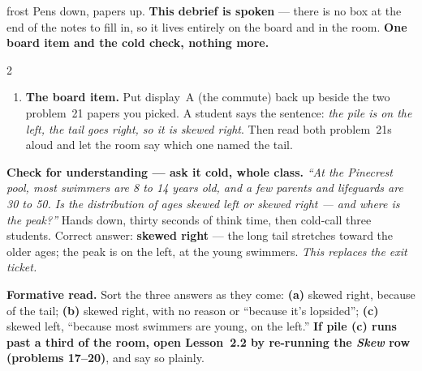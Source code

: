 \documentclass[10pt]{article}
\begin{document}
\boxguard[24]
\begin{skillbox}{frost}
Pens down, papers up. \textbf{This debrief is spoken} --- there is no box at the end of the
notes to fill in, so it lives entirely on the board and in the room. \textbf{One board item and
the cold check, nothing more.}
\begin{multicols}{2}
\begin{enumerate}[leftmargin=1.3em, nosep, itemsep=3pt]
  \item \textbf{The board item.} Put display~A (the commute) back up beside the two problem~21
        papers you picked. A student says the sentence: \emph{the pile is on the left, the tail
        goes right, so it is skewed right}. Then read both problem~21s aloud and let the room
        say which one named the tail.
\end{enumerate}
\columnbreak
\textbf{Check for understanding --- ask it cold, whole class.} \emph{``At the Pinecrest pool, most
swimmers are 8 to 14 years old, and a few parents and lifeguards are 30 to 50. Is the
distribution of ages skewed left or skewed right --- and where is the peak?''} Hands down, thirty
seconds of think time, then cold-call three students. Correct answer: \textbf{skewed right} ---
the long tail stretches toward the older ages; the peak is on the left, at the young swimmers.
\emph{This replaces the exit ticket.}

\textbf{Formative read.} Sort the three answers as they come: \textbf{(a)} skewed right,
because of the tail; \textbf{(b)} skewed right, with no reason or ``because it's lopsided'';
\textbf{(c)} skewed left, ``because most swimmers are young, on the left.'' \textbf{If pile (c)
runs past a third of the room, open Lesson~2.2 by re-running the \emph{Skew} row
(problems 17--20)}, and say so plainly.
\end{multicols}
\end{skillbox}
\end{document}
